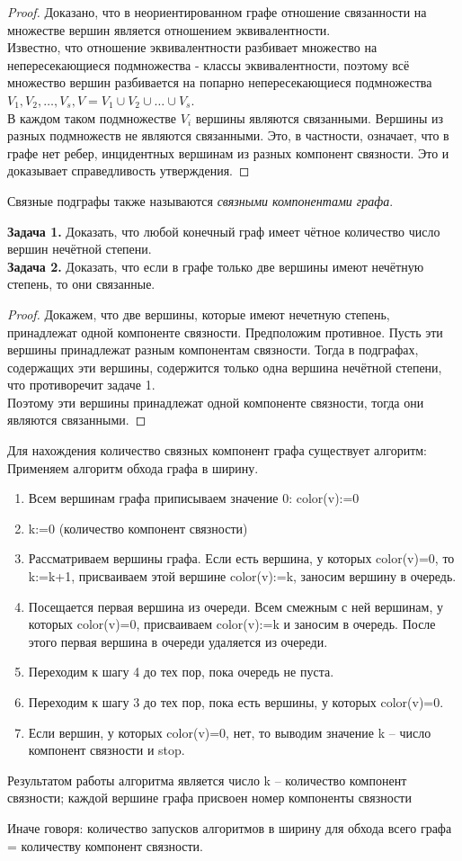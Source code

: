 \begin{proof}
    Доказано, что в неориентированном графе отношение
    связанности на множестве вершин является отношением эквивалентности.\\
    Известно, что отношение эквивалентности разбивает множество на
    непересекающиеся подмножества - классы эквивалентности, поэтому всё
    множество вершин разбивается на попарно непересекающиеся подмножества
    $V_1,V_2,\dots,V_s, V=V_1 \cup V_2 \cup \dots \cup V_s$.\\
    В каждом таком подмножестве $V_i$ вершины являются связанными. Вершины
    из разных подмножеств не являются связанными. Это, в частности, означает,
    что в графе нет ребер, инцидентных вершинам из разных компонент
    связности. Это и доказывает справедливость утверждения.
\end{proof}

Связные подграфы также называются \textit{связными компонентами графа}.

\textbf{Задача 1.} Доказать, что любой конечный граф имеет чётное количество число
вершин нечётной степени.\\
\textbf{Задача 2.} Доказать, что если в графе только две вершины имеют нечётную
степень, то они связанные.
\begin{proof}
    Докажем, что две вершины, которые имеют нечетную степень, принадлежат
    одной компоненте связности. Предположим противное. Пусть эти вершины
    принадлежат разным компонентам связности. Тогда в подграфах, содержащих
    эти вершины, содержится только одна вершина нечётной степени, что
    противоречит задаче 1.\\
    Поэтому эти вершины принадлежат одной компоненте связности, тогда они
    являются связанными.
\end{proof}

Для нахождения количество связных компонент графа существует алгоритм:
Применяем алгоритм обхода графа в ширину.
\begin{enumerate}[left=0.0em, labelsep=1em, topsep=0.5em, itemsep=0pt, parsep=0.5em]
    \item Всем вершинам графа приписываем значение 0: color(v):=0
    \item k:=0 (количество компонент связности)
    \item Рассматриваем вершины графа.
    Если есть вершина, у которых color(v)=0, то k:=k+1, присваиваем этой
    вершине color(v):=k, заносим вершину в очередь.
    \item Посещается первая вершина из очереди. Всем смежным с ней
    вершинам, у которых color(v)=0, присваиваем color(v):=k и заносим
    в очередь. После этого первая вершина в очереди удаляется из очереди.
    \item Переходим к шагу 4 до тех пор, пока очередь не пуста.
    \item Переходим к шагу 3 до тех пор, пока есть вершины, у которых
    color(v)=0.
    \item Если вершин, у которых color(v)=0, нет, то выводим значение k – число
    компонент связности и stop.
\end{enumerate}

Результатом работы алгоритма является число k -- количество компонент
связности; каждой вершине графа присвоен номер компоненты связности

Иначе говоря: количество запусков алгоритмов в ширину для обхода всего графа
= количеству компонент связности.